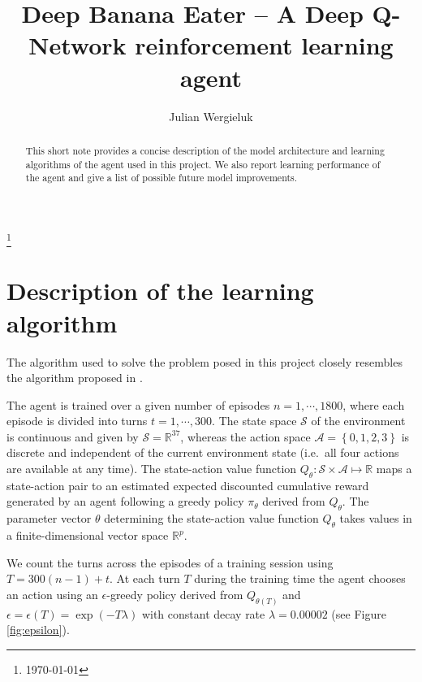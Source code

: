 \documentclass[a4paper,11pt]{amsart}
\title{Deep Banana Eater -- A Deep Q-Network reinforcement learning agent}
\author{Julian Wergieluk}\address{}\email{julian.wergieluk@risklab.com}
\begin{document}
\maketitle

\begin{abstract}
This short note provides a concise description of the model architecture and
learning algorithms of the agent used in this project. We also report learning
performance of the agent and give a list of possible future model improvements.
\end{abstract}
\renewcommand*{\thefootnote}{}\footnote{\today{}}

\section{Description of the learning algorithm}


The algorithm used to solve the problem posed in this project closely resembles
the algorithm proposed in \cite{mnih2015humanlevel}.

The agent is trained over a given number of episodes $n = 1,\cdots, 1800$,
where each episode is divided into turns $t = 1,\cdots, 300$.
The state space $\mathcal S$ of the environment is continuous and given by
$\mathcal S = \mathbb R^{37}$, whereas the action space $\mathcal A = \left\{
0,1,2,3 \right\}$ is discrete and independent of the current environment state
(i.e.\ all four actions are available at any time). The state-action value
function $Q_{\theta}: \mathcal S \times \mathcal A \mapsto \mathbb R$ maps a
state-action pair to an estimated expected discounted cumulative reward
generated by an agent following a greedy policy $\pi_{\theta}$ derived from $Q_{\theta}$.
The parameter vector $\theta$ determining the state-action value function
$Q_{\theta}$ takes values in a finite-dimensional vector space $\mathbb R^{p}$. 

We count the turns across the episodes of a training session using $T =
300(n-1) + t$. At each turn $T$ during the training time the agent chooses an
action using an $\epsilon$-greedy policy derived from $Q_{\theta(T)}$ and
$\epsilon = \epsilon(T) = \operatorname{exp}\left( -T \lambda \right)$ with
constant decay rate $\lambda = 0.00002$ (see Figure \ref{fig:epsilon}).
\end{document}
